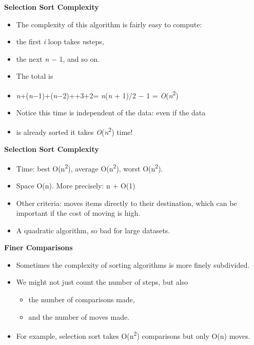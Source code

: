 \documentclass{beamer}
\begin{document}
\begin{frame}
\begin{center}
\textbf{Selection Sort Complexity}
\end{center}
\begin{itemize}
\item The complexity of this algorithm is fairly easy to compute:
\item the first \textit{i} loop takes \textit{n}steps, 
\item the next \textit{n }$-$ 1, and so on. 
\bigskip
\item The total is 
\item \textit{n}+(\textit{n}$-$1)+(\textit{n}$-$2)+{\textperiodcentered}{\textperiodcentered}{\textperiodcentered}+3+2=
\textit{n}(\textit{n }+ 1)/2 $-$ 1 = \textit{O}(\textit{n}\textsuperscript{2})
\item Notice this time is independent of the data: even if the data
\item is already sorted it takes \textit{O}(\textit{n}\textsuperscript{2}) time!
\end{itemize}

\end{frame} 

\begin{frame}
\begin{center}
\textbf{Selection Sort Complexity}
\end{center}
\begin{itemize}
\item Time: best O(n\textsuperscript{2}), average O(n\textsuperscript{2}), worst O(n\textsuperscript{2}).
\item Space O(n). More precisely: n + O(1)
\item Other criteria: moves items directly to their destination, which can be important if the cost of moving is high. 
\item A quadratic algorithm, so bad for large datasets.
\end{itemize}

\end{frame} 

\begin{frame}
\begin{center}
\textbf{Finer Comparisons}
\end{center}
\begin{itemize}
\item Sometimes the complexity of sorting algorithms is more finely subdivided.
\item We might not just count the number of steps, but also

\begin{itemize}
\item the number of comparisons made, 
\item and the number of moves made.
\end{itemize}
\item For example, selection sort takes O(n\textsuperscript{2}) comparisons but only O(n) moves.
\end{itemize}

\end{frame} 
\end{document}
